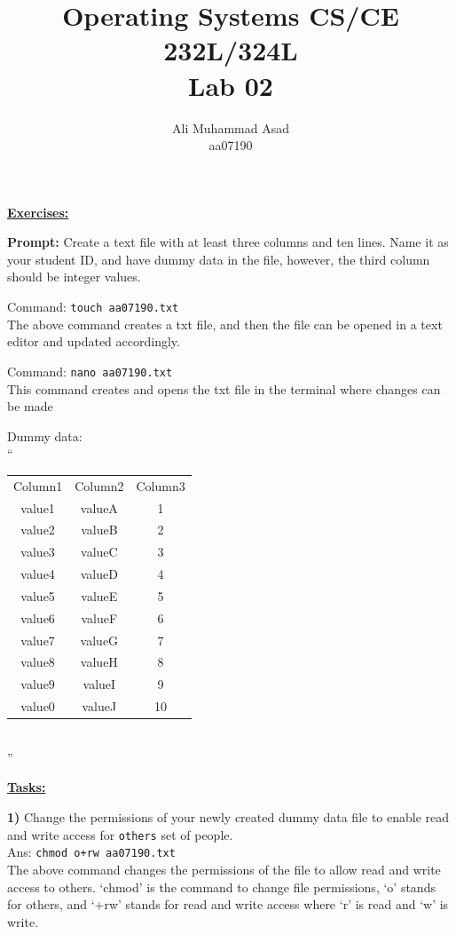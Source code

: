 \documentclass{article}
\title{\textbf{Operating Systems CS/CE 232L/324L}\\ \textbf{Lab 02}}
\author{Ali Muhammad Asad \\ aa07190}
\date{} %
\theoremstyle{mytheoremstyle}
\theoremstyle{mytheoremstyle}
\theoremstyle{myproblemstyle}
\begin{document}
\maketitle
    
{\Large \textbf{\underline{Exercises:}}}

\noindent\textbf{Prompt:} Create a text file with at least three columns and ten lines. Name it as your student ID, and have dummy data in the file, however, the third column should be integer values.

Command: \texttt{touch aa07190.txt} \\ The above command creates a txt file, and then the file can be opened in a text editor and updated accordingly.

Command: \texttt{nano aa07190.txt} \\ This command creates and opens the txt file in the terminal where changes can be made

Dummy data: \\ `` \\
\begin{tabular}{c c c}
    Column1 & Column2 & Column3 \\
    value1 & valueA & 1 \\
    value2 & valueB & 2 \\
    value3 & valueC & 3 \\
    value4 & valueD & 4 \\
    value5 & valueE & 5 \\
    value6 & valueF & 6 \\
    value7 & valueG & 7 \\
    value8 & valueH & 8 \\
    value9 & valueI & 9 \\
    value0 & valueJ & 10 \\
\end{tabular} \\
''

\textbf{\underline{Tasks:}}

\textbf{1)} Change the permissions of your newly created dummy data file to enable read and write access for \texttt{others} set of people. \\ 
Ans: \texttt{chmod o+rw aa07190.txt} \\
The above command changes the permissions of the file to allow read and write access to others. `chmod' is the command to change file permissions, `o' stands for others, and `+rw' stands for read and write access where `r' is read and `w' is write.
\end{document}
